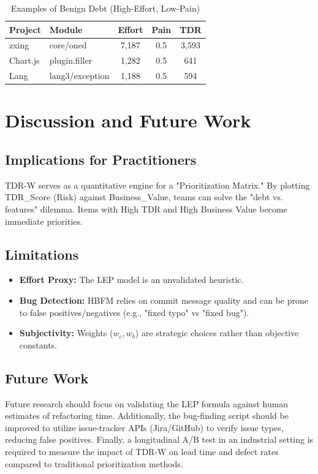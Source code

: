 \documentclass[conference]{IEEEtran}
\begin{document}
\begin{table}[htbp]
\caption{Examples of Benign Debt (High-Effort, Low-Pain)}
\begin{center}
\begin{tabular}{|l|p{3cm}|c|c|c|}
\hline
\textbf{Project} & \textbf{Module} & \textbf{Effort} & \textbf{Pain} & \textbf{TDR} \\
\hline
zxing & core/oned & 7,187 & 0.5 & 3,593 \\
Chart.js & plugin.filler & 1,282 & 0.5 & 641 \\
Lang & lang3/exception & 1,188 & 0.5 & 594 \\
\hline
\end{tabular}
\label{tab2}
\end{center}
\end{table}

\section{Discussion and Future Work}

\subsection{Implications for Practitioners}
TDR-W serves as a quantitative engine for a "Prioritization Matrix." By plotting TDR\_Score (Risk) against Business\_Value, teams can solve the "debt vs. features" dilemma. Items with High TDR and High Business Value become immediate priorities.

\subsection{Limitations}
\begin{itemize}
    \item \textbf{Effort Proxy:} The LEP model is an unvalidated heuristic.
    \item \textbf{Bug Detection:} HBFM relies on commit message quality and can be prone to false positives/negatives (e.g., "fixed typo" vs "fixed bug").
    \item \textbf{Subjectivity:} Weights ($w_c, w_b$) are strategic choices rather than objective constants.
\end{itemize}

\subsection{Future Work}
Future research should focus on validating the LEP formula against human estimates of refactoring time. Additionally, the bug-finding script should be improved to utilize issue-tracker APIs (Jira/GitHub) to verify issue types, reducing false positives. Finally, a longitudinal A/B test in an industrial setting is required to measure the impact of TDR-W on lead time and defect rates compared to traditional prioritization methods.
\end{document}

